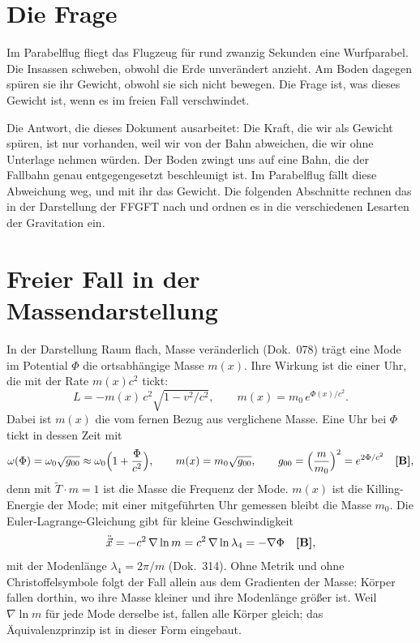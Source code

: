 \section{Die Frage}

Im Parabelflug fliegt das Flugzeug für rund zwanzig Sekunden eine Wurfparabel. Die Insassen
schweben, obwohl die Erde unverändert anzieht. Am Boden dagegen spüren sie ihr Gewicht, obwohl
sie sich nicht bewegen. Die Frage ist, was dieses Gewicht ist, wenn es im freien Fall
verschwindet.

Die Antwort, die dieses Dokument ausarbeitet: Die Kraft, die wir als Gewicht spüren, ist nur
vorhanden, weil wir von der Bahn abweichen, die wir ohne Unterlage nehmen würden. Der Boden zwingt
uns auf eine Bahn, die der Fallbahn genau entgegengesetzt beschleunigt ist. Im Parabelflug fällt
diese Abweichung weg, und mit ihr das Gewicht. Die folgenden Abschnitte rechnen das in der
Darstellung der FFGFT nach und ordnen es in die verschiedenen Lesarten der Gravitation ein.

\section{Freier Fall in der Massendarstellung}

In der Darstellung \glqq Raum flach, Masse veränderlich\grqq{} (Dok.~078) trägt eine Mode im
Potential $\Phi$ die ortsabhängige Masse $m(x)$. Ihre Wirkung ist die einer Uhr, die mit der
Rate $m(x)c^2$ tickt:
\begin{equation}
L=-m(x)\,c^2\sqrt{1-v^2/c^2},\qquad m(x)=m_0\,e^{\Phi(x)/c^2}.
\end{equation}
Dabei ist $m(x)$ die vom fernen Bezug aus verglichene Masse. Eine Uhr bei $\Phi$ tickt in dessen
Zeit mit
\begin{equation}
\omega(\Phi)=\omega_0\sqrt{g_{00}}\approx\omega_0\Bigl(1+\frac{\Phi}{c^2}\Bigr),\qquad
m(x)=m_0\sqrt{g_{00}},\qquad g_{00}=\Bigl(\frac{m}{m_0}\Bigr)^2=e^{2\Phi/c^2}\quad\textbf{[B]},
\end{equation}
denn mit $\tilde T\cdot m=1$ ist die Masse die Frequenz der Mode. $m(x)$ ist die Killing-Energie
der Mode; mit einer mitgeführten Uhr gemessen bleibt die Masse $m_0$.
Die Euler-Lagrange-Gleichung gibt für kleine Geschwindigkeit
\begin{equation}
\ddot{\vec x}=-c^2\,\nabla\ln m=c^2\,\nabla\ln\lambda_4=-\nabla\Phi\quad\textbf{[B]},
\end{equation}
mit der Modenlänge $\lambda_4=2\pi/m$ (Dok.~314). Ohne Metrik und ohne Christoffelsymbole folgt der
Fall allein aus dem Gradienten der Masse: Körper fallen dorthin, wo ihre Masse kleiner und ihre
Modenlänge größer ist. Weil $\nabla\ln m$ für jede Mode derselbe ist, fallen alle Körper gleich;
das Äquivalenzprinzip ist in dieser Form eingebaut.

